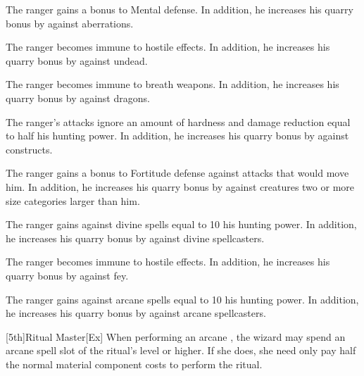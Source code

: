         The ranger gains a  bonus to Mental defense.
        In addition, he increases his quarry bonus by  against aberrations.

        The ranger becomes immune to hostile  effects.
        In addition, he increases his quarry bonus by  against undead.

        The ranger becomes immune to breath weapons.
        In addition, he increases his quarry bonus by  against dragons.

        The ranger's attacks ignore an amount of hardness and damage reduction equal to half his hunting power.
        In addition, he increases his quarry bonus by  against constructs.

        The ranger gains a  bonus to Fortitude defense against attacks that would move him.  %
        In addition, he increases his quarry bonus by  against creatures two or more size categories larger than him.

        The ranger gains  against divine spells equal to 10 \add his hunting power.
        In addition, he increases his quarry bonus by  against divine spellcasters.

        The ranger becomes immune to hostile  effects.
        In addition, he increases his quarry bonus by  against fey.

        The ranger gains  against arcane spells equal to 10 \add his hunting power.
        In addition, he increases his quarry bonus by  against arcane spellcasters.

        [5th]{Ritual Master}[Ex]
        When performing an arcane , the wizard may spend an arcane spell slot of the ritual's level or higher.
        If she does, she need only pay half the normal material component costs to perform the ritual.
